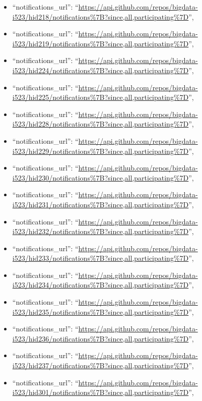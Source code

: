 \begin{itemize}
\item
  ``notifications\_url'':
  ``\url{https://api.github.com/repos/bigdata-i523/hid218/notifications\%7B?since,all,participating\%7D}'',
\item
  ``notifications\_url'':
  ``\url{https://api.github.com/repos/bigdata-i523/hid219/notifications\%7B?since,all,participating\%7D}'',
\item
  ``notifications\_url'':
  ``\url{https://api.github.com/repos/bigdata-i523/hid224/notifications\%7B?since,all,participating\%7D}'',
\item
  ``notifications\_url'':
  ``\url{https://api.github.com/repos/bigdata-i523/hid225/notifications\%7B?since,all,participating\%7D}'',
\item
  ``notifications\_url'':
  ``\url{https://api.github.com/repos/bigdata-i523/hid228/notifications\%7B?since,all,participating\%7D}'',
\item
  ``notifications\_url'':
  ``\url{https://api.github.com/repos/bigdata-i523/hid229/notifications\%7B?since,all,participating\%7D}'',
\item
  ``notifications\_url'':
  ``\url{https://api.github.com/repos/bigdata-i523/hid230/notifications\%7B?since,all,participating\%7D}'',
\item
  ``notifications\_url'':
  ``\url{https://api.github.com/repos/bigdata-i523/hid231/notifications\%7B?since,all,participating\%7D}'',
\item
  ``notifications\_url'':
  ``\url{https://api.github.com/repos/bigdata-i523/hid232/notifications\%7B?since,all,participating\%7D}'',
\item
  ``notifications\_url'':
  ``\url{https://api.github.com/repos/bigdata-i523/hid233/notifications\%7B?since,all,participating\%7D}'',
\item
  ``notifications\_url'':
  ``\url{https://api.github.com/repos/bigdata-i523/hid234/notifications\%7B?since,all,participating\%7D}'',
\item
  ``notifications\_url'':
  ``\url{https://api.github.com/repos/bigdata-i523/hid235/notifications\%7B?since,all,participating\%7D}'',
\item
  ``notifications\_url'':
  ``\url{https://api.github.com/repos/bigdata-i523/hid236/notifications\%7B?since,all,participating\%7D}'',
\item
  ``notifications\_url'':
  ``\url{https://api.github.com/repos/bigdata-i523/hid237/notifications\%7B?since,all,participating\%7D}'',
\item
  ``notifications\_url'':
  ``\url{https://api.github.com/repos/bigdata-i523/hid301/notifications\%7B?since,all,participating\%7D}'',

\end{itemize}
